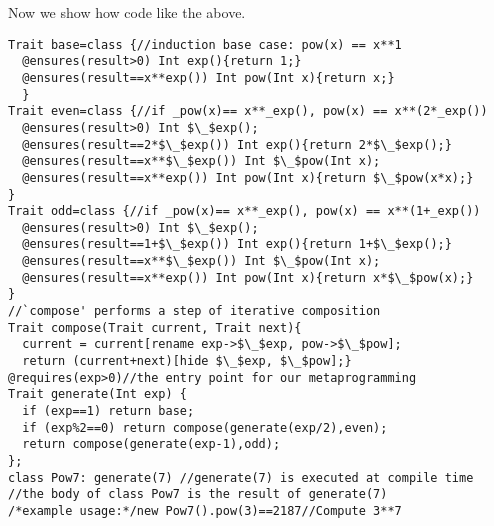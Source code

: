 Now we show how  code like the above.

\vspace{-1ex}
\begin{lstlisting}[firstnumber=11]
Trait base=class {//induction base case: pow(x) == x**1
  @ensures(result>0) Int exp(){return 1;}  
  @ensures(result==x**exp()) Int pow(Int x){return x;}
  }
Trait even=class {//if _pow(x)== x**_exp(), pow(x) == x**(2*_exp())
  @ensures(result>0) Int $\_$exp();
  @ensures(result==2*$\_$exp()) Int exp(){return 2*$\_$exp();}
  @ensures(result==x**$\_$exp()) Int $\_$pow(Int x);
  @ensures(result==x**exp()) Int pow(Int x){return $\_$pow(x*x);}
}
Trait odd=class {//if _pow(x)== x**_exp(), pow(x) == x**(1+_exp())
  @ensures(result>0) Int $\_$exp();
  @ensures(result==1+$\_$exp()) Int exp(){return 1+$\_$exp();}
  @ensures(result==x**$\_$exp()) Int $\_$pow(Int x);
  @ensures(result==x**exp()) Int pow(Int x){return x*$\_$pow(x);}
}
//`compose' performs a step of iterative composition
Trait compose(Trait current, Trait next){
  current = current[rename exp->$\_$exp, pow->$\_$pow];
  return (current+next)[hide $\_$exp, $\_$pow];}
@requires(exp>0)//the entry point for our metaprogramming
Trait generate(Int exp) {
  if (exp==1) return base;
  if (exp%2==0) return compose(generate(exp/2),even);
  return compose(generate(exp-1),odd);
};
class Pow7: generate(7) //generate(7) is executed at compile time
//the body of class Pow7 is the result of generate(7)
/*example usage:*/new Pow7().pow(3)==2187//Compute 3**7
\end{lstlisting}
\vspace{-1ex}